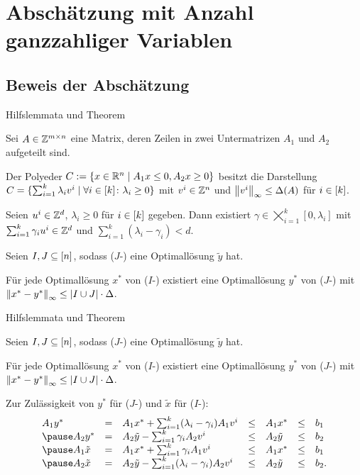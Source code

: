 \section{Abschätzung mit Anzahl ganzzahliger Variablen}

\subsection{Beweis der Abschätzung}

\begin{frame}{Hilfslemmata und Theorem}
	\begin{lemma}
		Sei $A\in\mathbb{Z}^{m\times n}$ eine Matrix, deren Zeilen in zwei Untermatrizen $A_1$ und $A_2$ aufgeteilt sind.
		
		Der Polyeder $C:=\{ x\in\mathbb{R}^n \mid A_1x\leq 0, A_2x\geq0 \}$ besitzt die Darstellung $C=\{\sum_{i=1}^k\lambda_i v^i \mid \forall i\in[k] \colon\lambda_i\geq0 \}$ mit $v^i\in\mathbb{Z}^n$ und $\left\lVert v^i\right\rVert_\infty\leq\Delta(A)$ für $i\in[k]$.
	\end{lemma}
	\pause
	\begin{lemma}\label{lem:maxgamma}
		Seien $u^i\in\mathbb{Z}^d$, $\lambda_i\geq0$ für $i\in[k]$ gegeben.
		Dann existiert $\gamma\in\bigtimes_{i=1}^k [0,\lambda_i]$ mit $\sum_{i=1}^k \gamma_i u^i\in\mathbb{Z}^d$ und  $\sum_{i=1}^k(\lambda_i-\gamma_i)<d$.
	\end{lemma}
	\pause
	\begin{theorem}\label{thm:theo2}
		Seien $I,J\subseteq[n]$, sodass ($J$-\MIPI) eine Optimallösung $\tilde{y}$ hat.
		
		Für jede Optimallösung $x^*$ von ($I$-\MIPI) existiert eine Optimallösung $y^*$ von ($J$-\MIPI) mit $\left\lVert x^*-y^*\right\rVert_\infty\leq\lvert I\cup J \rvert\cdot\Delta$.
	\end{theorem}
\end{frame}

\begin{frame}{Hilfslemmata und Theorem}
\begin{theorem}\label{thm:theo2}
Seien $I,J\subseteq[n]$, sodass ($J$-\MIPI) eine Optimallösung $\tilde{y}$ hat.

Für jede Optimallösung $x^*$ von ($I$-\MIPI) existiert eine Optimallösung $y^*$ von ($J$-\MIPI) mit $\left\lVert x^*-y^*\right\rVert_\infty\leq\lvert I\cup J \rvert\cdot\Delta$.
\end{theorem}
Zur Zulässigkeit von $y^*$ für ($J$-\MIPI) und $\tilde{x}$ für ($I$-\MIPI):
\pause
$$
\begin{array}{lllllll}
A_1 y^*&=&A_1x^*+\sum_{i=1}^k(\lambda_i-\gamma_i)A_1v^i &\leq& A_1 x^* &\leq&b_1\\ \pause
A_2 y^*&=&A_2\tilde{y}-\sum_{i=1}^k\gamma_iA_2v^i &\leq& A_2\tilde{y} &\leq& b_2\\ \pause
A_1\tilde{x} &=&A_1x^*+\sum_{i=1}^k \gamma_iA_1v^i &\leq& A_1x^* &\leq&b_1\\ \pause
A_2\tilde{x} &=&A_2\tilde{y}-\sum_{i=1}^k(\lambda_i-\gamma_i)A_2v^i&\leq& A_2\tilde{y}&\leq& b_2.
\end{array}
$$
\end{frame}

